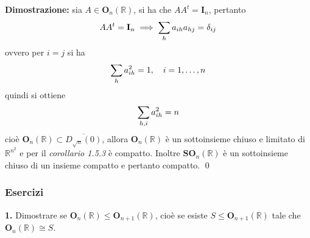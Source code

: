 \documentclass{article}
\begin{document}
\textbf{Dimostrazione:} sia $A \in \mathbf{O}_n(\mathbb{R})$, si ha che $AA^t = \mathbf{I}_n$, pertanto
\begin{gather}
    AA^t = \mathbf{I}_n \implies \sum_h a_{ih}a_{hj} = \delta_{ij} \notag
\end{gather}
ovvero per $i = j$ si ha
\begin{gather}
    \sum_h a^2_{ih} = 1, \quad i = 1, \dots, n \notag
\end{gather}
quindi si ottiene
\begin{gather}
    \sum_{h, i} a^2_{ih} = n \notag
\end{gather}
cioè $\mathbf{O}_n(\mathbb{R}) \subset \overline{D_{\sqrt{n}}(0)}$, allora $\mathbf{O}_n(\mathbb{R})$ è un sottoinsieme chiuso e limitato di $\mathbb{R}^{n^2}$ e per il \textit{corollario 1.5.3} è compatto. Inoltre $\mathbf{SO}_n(\mathbb{R})$ è un sottoinsieme chiuso di un insieme compatto e pertanto compatto. \qed

\subsubsection{Esercizi}
\textbf{1.} Dimostrare se $\mathbf{O}_n(\mathbb{R}) \leq \mathbf{O}_{n + 1}(\mathbb{R})$, cioè se esiste $S \leq \mathbf{O}_{n + 1}(\mathbb{R})$ tale che $\mathbf{O}_n(\mathbb{R}) \cong S$. \\
\end{document}
